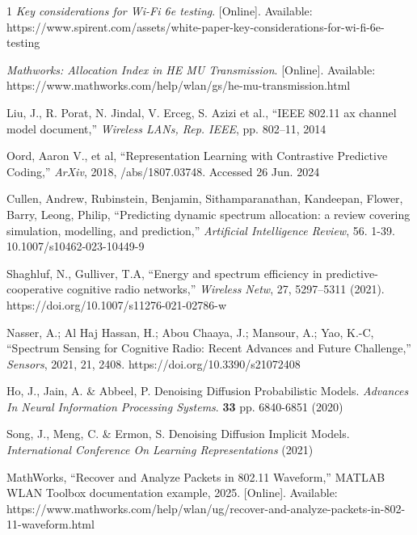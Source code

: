 \documentclass[lettersize,journal]{IEEEtran}
\begin{document}
\begin{thebibliography}{1}
{\it{Key considerations for Wi-Fi 6e testing}}. [Online]. Available: https://www.spirent.com/assets/white-paper-key-considerations-for-wi-fi-6e-testing

{\it{Mathworks: Allocation Index in HE MU Transmission}}. [Online]. Available: https://www.mathworks.com/help/wlan/gs/he-mu-transmission.html

Liu, J., R. Porat, N. Jindal, V. Erceg, S. Azizi et al., ``IEEE 802.11 ax channel model document,'' \textit{Wireless LANs, Rep. IEEE}, pp. 802–11, 2014

Oord, Aaron V., et al, ``Representation Learning with Contrastive Predictive Coding,'' \textit{ArXiv}, 2018,  /abs/1807.03748. Accessed 26 Jun. 2024

Cullen, Andrew, Rubinstein, Benjamin, Sithamparanathan, Kandeepan, Flower, Barry, Leong, Philip, ``Predicting dynamic spectrum allocation: a review covering simulation, modelling, and prediction,'' \textit{Artificial Intelligence Review}, 56. 1-39. 10.1007/s10462-023-10449-9

Shaghluf, N., Gulliver, T.A, ``Energy and spectrum efficiency in predictive-cooperative cognitive radio networks,'' \textit{Wireless Netw}, 27, 5297–5311 (2021). https://doi.org/10.1007/s11276-021-02786-w

Nasser, A.; Al Haj Hassan, H.; Abou Chaaya, J.; Mansour, A.; Yao, K.-C, ``Spectrum Sensing for Cognitive Radio: Recent Advances and Future Challenge,'' \textit{Sensors}, 2021, 21, 2408. https://doi.org/10.3390/s21072408

Ho, J., Jain, A. \& Abbeel, P. Denoising Diffusion Probabilistic Models. {\em Advances In Neural Information Processing Systems}. \textbf{33} pp. 6840-6851 (2020)

Song, J., Meng, C. \& Ermon, S. Denoising Diffusion Implicit Models. {\em International Conference On Learning Representations} (2021)

MathWorks, ``Recover and Analyze Packets in 802.11 Waveform,'' MATLAB WLAN Toolbox documentation example, 2025. [Online]. Available: https://www.mathworks.com/help/wlan/ug/recover-and-analyze-packets-in-802-11-waveform.html





\end{thebibliography}
\end{document}
